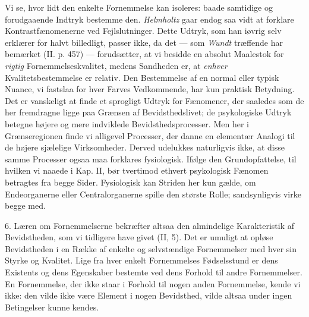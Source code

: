 \documentclass[12pt,a4paper,openany]{book}
\begin{document}
Vi se, hvor lidt den enkelte Fornemmelse kan isoleres: baade samtidige
og forudgaaende Indtryk bestemme den. \emph{Helmholtz} gaar endog saa
vidt at forklare Kontrastfænomenerne ved Fejlslutninger. Dette Udtryk,
som han iøvrig selv erklærer for halvt billedligt, passer ikke, da det
--- som \emph{Wundt} træffende har bemærket (II. p. 457) ---
forudsætter, at vi besidde en absolut Maalestok for \emph{rigtig}
Fornemmelseskvalitet, medens Sandheden er, at \emph{enhver}
Kvalitetsbestemmelse er relativ. Den Bestemmelse af en normal eller
typisk Nuance, vi fastslaa for hver Farves Vedkommende, har kun praktisk
Betydning. Det er vanskeligt at finde et sprogligt Udtryk for Fænomener,
der saaledes som de her fremdragne ligge paa Grænsen af
Bevidsthedslivet; de psykologiske Udtryk betegne højere og mere
indviklede Bevidsthedsprocesser. Men her i Grænseregionen finde vi
alligevel Processer, der danne en elementær Analogi til de højere
sjælelige Virksomheder. Derved udelukkes naturligvis ikke, at disse
samme Processer ogsaa maa forklares fysiologisk. Ifølge den
Grundopfattelse, til hvilken vi naaede i Kap. II, bør tvertimod ethvert
psykologisk Fænomen betragtes fra begge Sider. Fysiologisk kan Striden
her kun gælde, om Endeorganerne eller Centralorganerne spille den
største Rolle; sandsynligvis virke begge med.

6. Læren om Fornemmelserne bekræfter altsaa den almindelige
Karakteristik af Bevidstheden, som vi tidligere have givet (II, 5). Det
er umuligt at opløse Bevidstheden i en Række af enkelte og selvstændige
Fornemmelser med hver sin Styrke og Kvalitet. Lige fra hver enkelt
Fornemmelses Fødselsstund er dens Existents og dens Egenskaber bestemte
ved dens Forhold til andre Fornemmelser. En Fornemmelse, der ikke staar
i Forhold til nogen anden Fornemmelse, kende vi ikke: den vilde ikke
være Element i nogen Bevidsthed, vilde altsaa under ingen Betingelser
kunne kendes.
\end{document}
